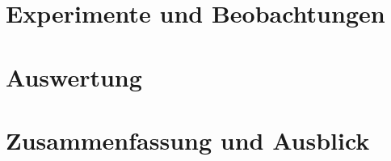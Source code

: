 \documentclass{scrartcl}
\begin{document}
\pagebreak
\section{Experimente und Beobachtungen}


\pagebreak
\section{Auswertung}

\pagebreak
\section{Zusammenfassung und Ausblick}

\pagebreak


\end{document}

